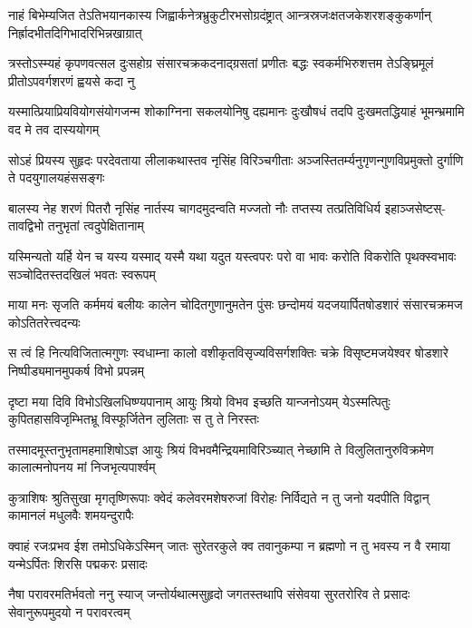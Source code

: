 \fourlineindentedshloka
{नाहं बिभेम्यजित तेऽतिभयानकास्य}
{जिह्वार्कनेत्रभ्रुकुटीरभसोग्रदंष्ट्रात्}
{आन्त्रस्रजःक्षतजकेशरशङ्कुकर्णान्}
{निर्ह्रादभीतदिगिभादरिभिन्नखाग्रात्} %

\fourlineindentedshloka
{त्रस्तोऽस्म्यहं कृपणवत्सल दुःसहोग्र}
{संसारचक्रकदनाद्ग्रसतां प्रणीतः}
{बद्धः स्वकर्मभिरुशत्तम तेऽङ्घ्रिमूलं}
{प्रीतोऽपवर्गशरणं ह्वयसे कदा नु} %

\fourlineindentedshloka
{यस्मात्प्रियाप्रियवियोगसंयोगजन्म}
{शोकाग्निना सकलयोनिषु दह्यमानः}
{दुःखौषधं तदपि दुःखमतद्धियाहं}
{भूमन्भ्रमामि वद मे तव दास्ययोगम्} %

\fourlineindentedshloka
{सोऽहं प्रियस्य सुहृदः परदेवताया}
{लीलाकथास्तव नृसिंह विरिञ्चगीताः}
{अञ्जस्तितर्म्यनुगृणन्गुणविप्रमुक्तो}
{दुर्गाणि ते पदयुगालयहंससङ्गः} %

\fourlineindentedshloka
{बालस्य नेह शरणं पितरौ नृसिंह}
{नार्तस्य चागदमुदन्वति मज्जतो नौः}
{तप्तस्य तत्प्रतिविधिर्य इहाञ्जसेष्टस्-}
{तावद्विभो तनुभृतां त्वदुपेक्षितानाम्} %

\fourlineindentedshloka
{यस्मिन्यतो यर्हि येन च यस्य यस्माद्}
{यस्मै यथा यदुत यस्त्वपरः परो वा}
{भावः करोति विकरोति पृथक्स्वभावः}
{सञ्चोदितस्तदखिलं भवतः स्वरूपम्} %

\fourlineindentedshloka
{माया मनः सृजति कर्ममयं बलीयः}
{कालेन चोदितगुणानुमतेन पुंसः}
{छन्दोमयं यदजयार्पितषोडशारं}
{संसारचक्रमज कोऽतितरेत्त्वदन्यः} %

\fourlineindentedshloka
{स त्वं हि नित्यविजितात्मगुणः स्वधाम्ना}
{कालो वशीकृतविसृज्यविसर्गशक्तिः}
{चक्रे विसृष्टमजयेश्वर षोडशारे}
{निष्पीड्यमानमुपकर्ष विभो प्रपन्नम्} %

\fourlineindentedshloka
{दृष्टा मया दिवि विभोऽखिलधिष्ण्यपानाम्}
{आयुः श्रियो विभव इच्छति यान्जनोऽयम्}
{येऽस्मत्पितुः कुपितहासविजृम्भितभ्रू}
{विस्फूर्जितेन लुलिताः स तु ते निरस्तः} %

\fourlineindentedshloka
{तस्मादमूस्तनुभृतामहमाशिषोऽज्ञ}
{आयुः श्रियं विभवमैन्द्रियमाविरिञ्च्यात्}
{नेच्छामि ते विलुलितानुरुविक्रमेण}
{कालात्मनोपनय मां निजभृत्यपार्श्वम्} %

\fourlineindentedshloka
{कुत्राशिषः श्रुतिसुखा मृगतृष्णिरूपाः}
{क्वेदं कलेवरमशेषरुजां विरोहः}
{निर्विद्यते न तु जनो यदपीति विद्वान्}
{कामानलं मधुलवैः शमयन्दुरापैः} %

\fourlineindentedshloka
{क्वाहं रजःप्रभव ईश तमोऽधिकेऽस्मिन्}
{जातः सुरेतरकुले क्व तवानुकम्पा}
{न ब्रह्मणो न तु भवस्य न वै रमाया}
{यन्मेऽर्पितः शिरसि पद्मकरः प्रसादः} %

\fourlineindentedshloka
{नैषा परावरमतिर्भवतो ननु स्याज्}
{जन्तोर्यथात्मसुहृदो जगतस्तथापि}
{संसेवया सुरतरोरिव ते प्रसादः}
{सेवानुरूपमुदयो न परावरत्वम्} %

